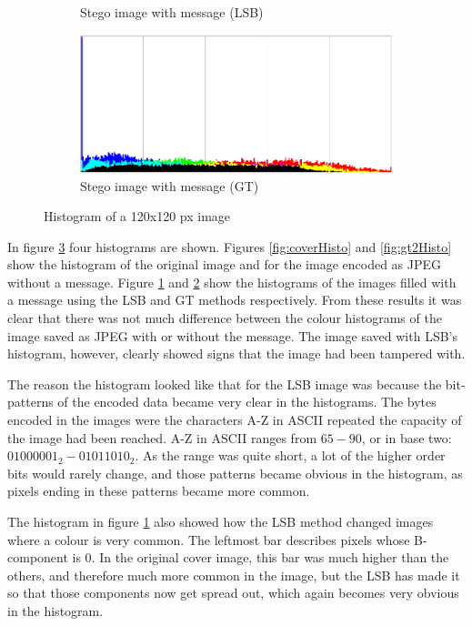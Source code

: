 \begin{figure}
\begin{subfigure}[b]{0.49\textwidth}
            \caption{Stego image with message (LSB)}
            \label{fig:lsbHisto}
    \end{subfigure}
    \begin{subfigure}[b]{0.49\textwidth}
            \includegraphics[width=\textwidth]{figures/gtOutHisto.png}
            \caption{Stego image with message (GT)}
            \label{fig:gtHisto}
    \end{subfigure}
    \caption{Histogram of a 120x120 px image}
    \label{fig:histogramsComparisons}
\end{figure}

In figure \ref{fig:histogramsComparisons} four histograms are shown.
Figures \ref{fig:coverHisto} and \ref{fig:gt2Histo} show the histogram of the original image and for the image encoded as JPEG without a message.
Figure \ref{fig:lsbHisto} and \ref{fig:gtHisto} show the histograms of the images filled with a message using the LSB and GT methods respectively.
From these results it was clear that there was not much difference between the colour histograms of the image saved as JPEG with or without the message.
The image saved with LSB's histogram, however, clearly showed signs that the image had been tampered with.

The reason the histogram looked like that for the LSB image was because the bit-patterns of the encoded data became very clear in the histograms.
The bytes encoded in the images were the characters A-Z in ASCII repeated the capacity of the image had been reached.
A-Z in ASCII ranges from $65-90$, or in base two: $01000001_2-01011010_2$.
As the range was quite short, a lot of the higher order bits would rarely change, and those patterns became obvious in the histogram, as pixels ending in these patterns became more common.

The histogram in figure \ref{fig:lsbHisto} also showed how the LSB method changed images where a colour is very common.
The leftmost bar describes pixels whose B-component is 0.
In the original cover image, this bar was much higher than the others, and therefore much more common in the image, but the LSB has made it so that those components now get spread out, which again becomes very obvious in the histogram.

